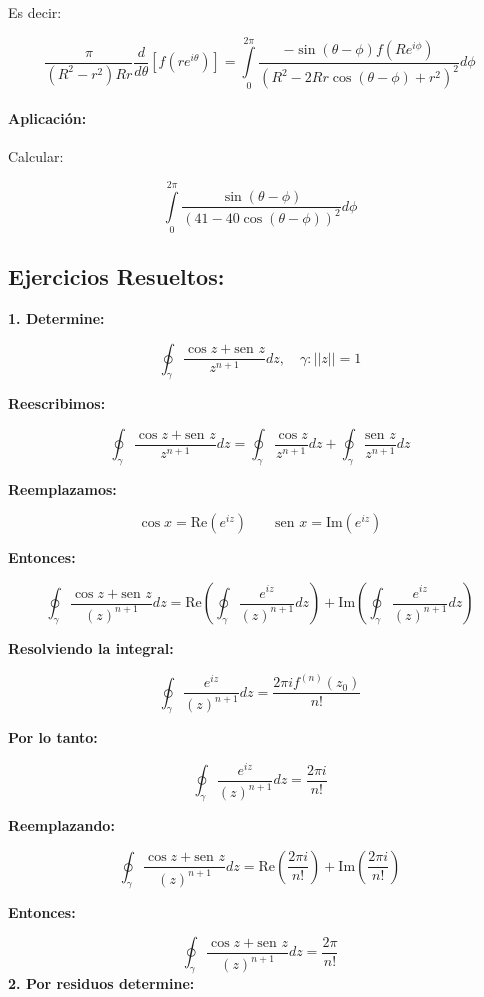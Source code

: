 \documentclass[a4paper,12pt]{article}
\begin{document}
Es decir:


\[
\frac{\pi}{(R^2 - r^2)Rr} \frac{d}{d\theta} \left[ f(re^{i\theta}) \right] = \int\limits_{0}^{2\pi} \frac{-\sin(\theta - \phi) f(Re^{i\phi})}{(R^2 - 2Rr \cos(\theta - \phi) + r^2)^2} d\phi
\]

\paragraph{Aplicación:}

Calcular:

\[
\int\limits_{0}^{2\pi} \frac{\sin(\theta - \phi)}{(41 - 40 \cos(\theta - \phi))^2} d\phi
\]
\newpage
\subsection{Ejercicios Resueltos:}
\textbf{1. Determine:}

\[
\oint_{\gamma} \frac{\cos z + \text{sen } z}{z^{n+1}} dz, \quad \gamma: ||z|| = 1
\]

\textbf{Reescribimos:}

\[
\oint_{\gamma} \frac{\cos z + \text{sen } z}{z^{n+1}} dz = \oint_{\gamma} \frac{\cos z}{z^{n+1}} dz + \oint_{\gamma} \frac{\text{sen } z}{z^{n+1}} dz
\]

\textbf{Reemplazamos:}

\[
\cos x = \text{Re}(e^{iz}) \qquad \text{sen } x = \text{Im}(e^{iz})
\]

\textbf{Entonces:}

\[
\oint_{\gamma} \frac{\cos z + \text{sen } z}{(z)^{n+1}} dz = \text{Re}\left(\oint_{\gamma} \frac{e^{iz}}{(z)^{n+1}} dz\right) + \text{Im}\left(\oint_{\gamma} \frac{e^{iz}}{(z)^{n+1}} dz\right)
\]

\textbf{Resolviendo la integral:}

\[
\oint_{\gamma} \frac{e^{iz}}{(z)^{n+1}} dz = \frac{2\pi i f^{(n)}(z_0)}{n!}
\]

\textbf{Por lo tanto:}

\[
\oint_{\gamma} \frac{e^{iz}}{(z)^{n+1}} dz = \frac{2\pi i}{n!}
\]

\textbf{Reemplazando:}

\[
\oint_{\gamma} \frac{\cos z + \text{sen } z}{(z)^{n+1}} dz = \text{Re}\left(\frac{2\pi i}{n!}\right) + \text{Im}\left(\frac{2\pi i}{n!}\right)
\]

\textbf{Entonces:}

\[
\oint_{\gamma} \frac{\cos z + \text{sen } z}{(z)^{n+1}} dz = \frac{2\pi}{n!}
\]
\textbf{2. Por residuos determine:}
\end{document}

